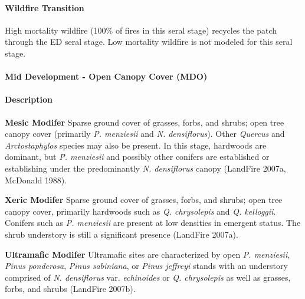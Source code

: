 \paragraph{Wildfire Transition} High mortality wildfire (100\% of fires in this seral stage) recycles the patch through the ED seral stage. Low mortality wildfire is not modeled for this seral stage.

\noindent\hrulefill


\paragraph{Mid Development - Open Canopy Cover (MDO)}

\paragraph{Description}
\begin{adjustwidth}{2cm}{}
\textbf{Mesic Modifer } Sparse ground cover of grasses, forbs, and shrubs; open tree canopy cover (primarily \emph{P. menziesii} and \emph{N. densiflorus}). Other \emph{Quercus} and \emph{Arctostaphylos} species may also be present. In this stage, hardwoods are dominant, but \emph{P. menziesii} and possibly other conifers are established or establishing under the predominantly \emph{N. densiflorus} canopy (LandFire 2007a, McDonald 1988). 


\medskip
\noindent \textbf{Xeric Modifer}  Sparse ground cover of grasses, forbs, and shrubs; open tree canopy cover, primarily hardwoods such as \emph{Q. chrysolepis} and \emph{Q. kelloggii}. Conifers such as \emph{P. menziesii} are present at low densities in emergent status. The shrub understory is still a significant presence (LandFire 2007a). 


\medskip
\noindent \textbf{Ultramafic Modifer}  Ultramafic sites are characterized by open \emph{P. menziesii}, \emph{Pinus ponderosa}, \emph{Pinus sabiniana}, or \emph{Pinus jeffreyi} stands with an understory comprised of \emph{N. densiflorus} var. \emph{echinoides} or \emph{Q. chrysolepis} as well as grasses, forbs, and shrubs (LandFire 2007b).

\end{adjustwidth}
